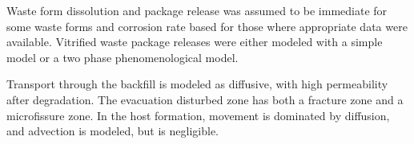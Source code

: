 




Waste form dissolution and package release was assumed to be immediate for some
waste forms and corrosion rate based for those where appropriate data were
available. Vitrified waste package releases were either modeled with a simple
model or a two phase phenomenological model. 


Transport through the backfill is modeled as diffusive, with high permeability 
after degradation.  The evacuation disturbed zone has both a fracture zone and a 
microfissure zone.  In the host formation, movement is dominated by diffusion, 
and advection is modeled, but is negligible.


% 





